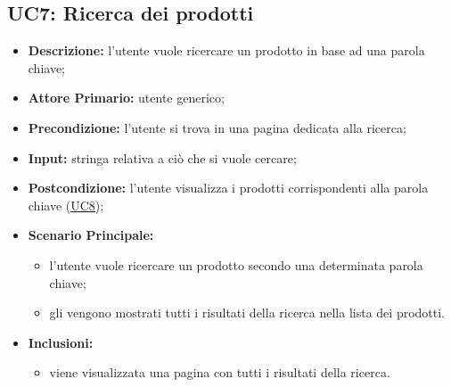 \subsection{UC7: Ricerca dei prodotti}
\label{sec:UC7}
\begin{itemize}
    \item \textbf{Descrizione:} l'utente vuole ricercare un prodotto in base ad una parola chiave;
    \item \textbf{Attore Primario:} utente generico;
    \item \textbf{Precondizione:} l'utente si trova in una pagina dedicata alla ricerca;
    \item \textbf{Input:} stringa relativa a ciò che si vuole cercare;
    \item \textbf{Postcondizione:} l'utente visualizza i prodotti corrispondenti alla parola chiave (\hyperref[sec:UC8]{\underline{UC8}});
    \item \textbf{Scenario Principale:}
          \begin{itemize}
              \item l'utente vuole ricercare un prodotto secondo una determinata parola chiave;
              \item gli vengono mostrati tutti i risultati della ricerca nella lista dei prodotti.
          \end{itemize}
    \item \textbf{Inclusioni:}
          \begin{itemize}
              \item viene visualizzata una pagina con tutti i risultati della ricerca.
          \end{itemize}
\end{itemize}